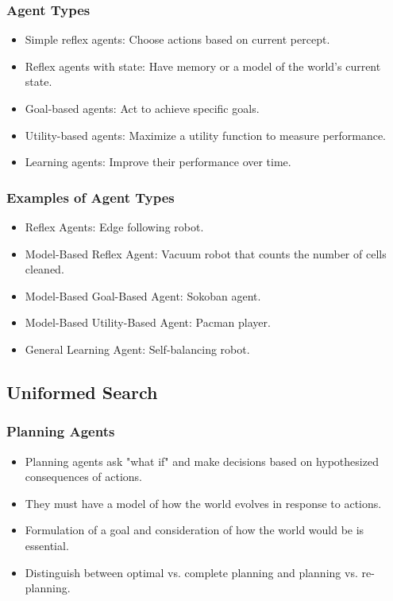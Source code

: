 \documentclass[8pt]{article}
\begin{document}
\subsubsection{Agent Types}
\begin{itemize}
    \item Simple reflex agents: Choose actions based on current percept.
    \item Reflex agents with state: Have memory or a model of the world’s current state.
    \item Goal-based agents: Act to achieve specific goals.
    \item Utility-based agents: Maximize a utility function to measure performance.
    \item Learning agents: Improve their performance over time.
\end{itemize}

\subsubsection{Examples of Agent Types}
\begin{itemize}
    \item Reflex Agents: Edge following robot.
    \item Model-Based Reflex Agent: Vacuum robot that counts the number of cells cleaned.
    \item Model-Based Goal-Based Agent: Sokoban agent.
    \item Model-Based Utility-Based Agent: Pacman player.
    \item General Learning Agent: Self-balancing robot.
\end{itemize}

\newpage
\subsection{Uniformed Search}
\subsubsection{Planning Agents}
\begin{itemize}
    \item Planning agents ask "what if" and make decisions based on hypothesized consequences of actions.
    \item They must have a model of how the world evolves in response to actions.
    \item Formulation of a goal and consideration of how the world would be is essential.
    \item Distinguish between optimal vs. complete planning and planning vs. re-planning.
\end{itemize}
\end{document}
